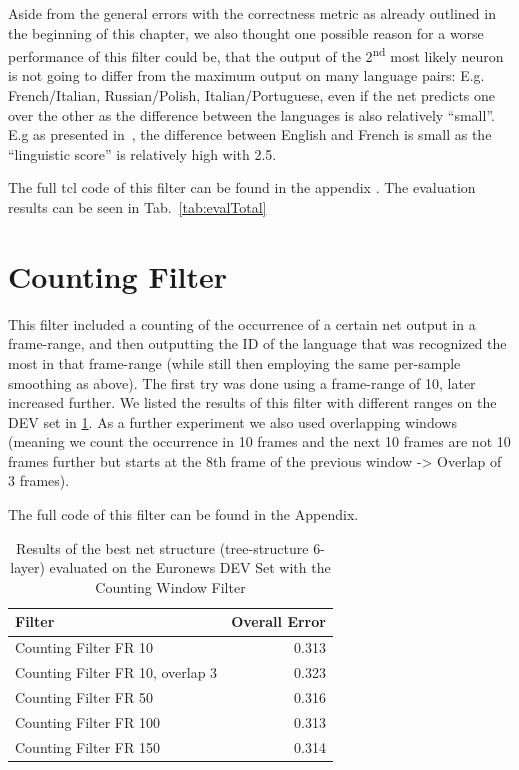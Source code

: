 Aside from the general errors with the correctness metric as already outlined in the beginning of this chapter, we also thought one possible reason for a worse performance of this filter could be, that the output of the 2\textsuperscript{nd} most likely neuron is not going to differ from the maximum output on many language pairs: E.g. French/Italian, Russian/Polish, Italian/Portuguese,  even if the net predicts one over the other as the difference between the languages is also relatively ``small''. E.g as presented in~\cite{doi:10.1080/14790710508668395}, the difference between English and French is small as the ``linguistic score'' is relatively high with 2.5. 

The full tcl code of this filter can be found in the appendix . The evaluation results can be seen in Tab.~\ref{tab:evalTotal}

\section{Counting Filter}
This filter included a counting of the occurrence of a certain net output in a frame-range, and then outputting the ID of the language that was recognized the most in that frame-range (while still then employing the same  per-sample smoothing as above). The first try was done using a frame-range of 10, later increased further. We listed the results of this filter with different ranges on the DEV set in \ref{tab:counting}. As a further experiment we also used overlapping windows (meaning we count the occurrence in 10 frames and the next 10 frames are not 10 frames further but starts at the 8th frame of the previous window -> Overlap of 3 frames).

The full code of this filter can be found in the Appendix.

\begin{table}[h!]
\caption{Results of the best net structure (tree-structure 6-layer) evaluated on the Euronews DEV Set with the Counting Window Filter}
\label{tab:counting}
\centering
\begin{tabular}{| l | r |}
	\hline
	\textbf{Filter} & \textbf{Overall Error}  \\
	\hline
	Counting Filter FR 10  & 0.313 \\
	\hline
	Counting Filter FR 10, overlap 3 &  0.323\\
	\hline
	Counting Filter FR 50 & 0.316 \\
	\hline
	Counting Filter FR 100 & 0.313\\
	\hline
	Counting Filter FR 150 & 0.314\\
	\hline
\end{tabular}

\end{table}


